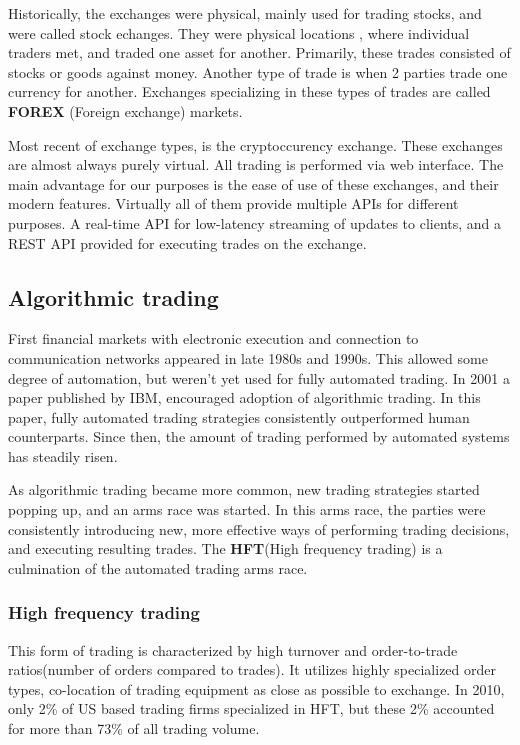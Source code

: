 Historically, the exchanges were physical, mainly used for trading stocks, and
were called stock echanges. They were physical locations , where individual traders met, and traded one asset for another.
Primarily, these trades consisted of stocks or goods against money. Another type of trade is when 2 parties trade one currency for another.
Exchanges specializing in these types of trades are called \textbf{FOREX} (Foreign exchange) markets.

Most recent of exchange types, is the cryptoccurency exchange. These exchanges are almost always purely virtual. All trading is performed
via web interface. The main advantage for our purposes is the ease of use of these exchanges, and their modern features.
Virtually all of them provide multiple APIs for different purposes. A real-time API for low-latency streaming of updates to clients,
and a REST API provided for executing trades on the exchange.

\subsection{Algorithmic trading}
First financial markets with electronic execution and connection to communication networks appeared
in late 1980s and 1990s. This allowed some degree of automation, but weren't yet used for fully
automated trading. In 2001 a paper published by IBM\cite{Tesauro:2001:HBA:501158.501183},
encouraged adoption of algorithmic trading. In this paper, fully automated trading strategies
consistently outperformed human counterparts. Since then, the amount of trading performed by
automated systems has steadily risen.

As algorithmic trading became more common, new trading strategies started popping up, and
an arms race was started. In this arms race, the parties were consistently introducing new,
more effective ways of performing trading decisions, and executing resulting trades. The \textbf{HFT}(High frequency trading)
is a culmination of the automated trading arms race.

\subsubsection{High frequency trading}
This form of trading is characterized by high turnover and order-to-trade ratios(number of orders compared to trades).
It utilizes highly specialized order types, co-location of trading equipment as close as possible to exchange.
In 2010, only 2\% of US based trading firms specialized in HFT, but these 2\% accounted for more than 73\% of all
trading volume\cite{article:computerized_trading}.

